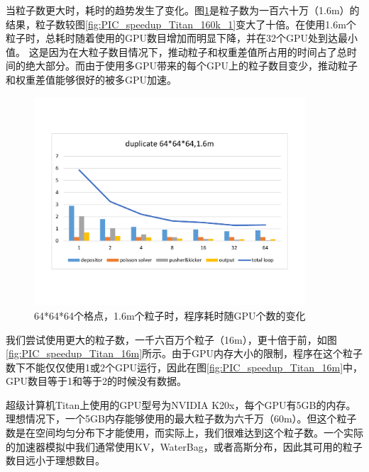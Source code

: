 当粒子数更大时，耗时的趋势发生了变化。图\ref{fig:PIC_speedup_Titan_1_6m}是粒子数为一百六十万（1.6m）的结果，粒子数较图\ref{fig:PIC_speedup_Titan_160k_1}变大了十倍。在使用1.6m个粒子时，总耗时随着使用的GPU数目增加而明显下降，并在32个GPU处到达最小值。
这是因为在大粒子数目情况下，推动粒子和权重差值所占用的时间占了总时间的绝大部分。而由于使用多GPU带来的每个GPU上的粒子数目变少，推动粒子和权重差值能够很好的被多GPU加速。

\begin{figure}[!htb]
  \centering
  \includegraphics[width=0.9\textwidth]{Img/PIC_speedup_Titan_1_6m.pdf}
  \caption{64*64*64个格点，1.6m个粒子时，程序耗时随GPU个数的变化}
  \label{fig:PIC_speedup_Titan_1_6m}
\end{figure}

我们尝试使用更大的粒子数，一千六百万个粒子（16m），更十倍于前，如图\ref{fig:PIC_speedup_Titan_16m}所示。由于GPU内存大小的限制，程序在这个粒子数下不能仅仅使用1或2个GPU运行，因此在图\ref{fig:PIC_speedup_Titan_16m}中，GPU数目等于1和等于2的时候没有数据。

超级计算机Titan上使用的GPU型号为NVIDIA K20x，每个GPU有5GB的内存。理想情况下，一个5GB内存能够使用的最大粒子数为六千万（60m）。但这个粒子数是在空间均匀分布下才能使用，而实际上，我们很难达到这个粒子数。一个实际的加速器模拟中我们通常使用KV，WaterBag，或者高斯分布，因此其可用的粒子数目远小于理想数目。

